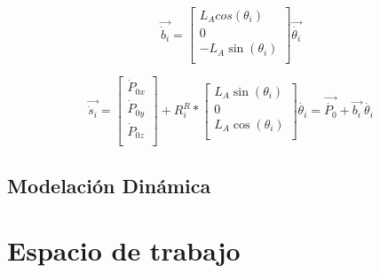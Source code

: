         \begin{equation}
                  \overrightarrow{\dot{b}_{i}}= \left[ \begin{matrix}
                L_{A} cos⁡ \left(  \theta _{i} \right) \\
                0\\
                - L_{A}\sin ⁡ \left(  \theta _{i} \right) \\
                \end{matrix}
                 \right] \overrightarrow{\dot{ \theta _{i}}}  
            \label{eq:cap4_MB_18}
        \end{equation} 
        
        \begin{equation}
                  \overrightarrow{\dot{s}_{i}}= \left[ \begin{matrix}
                \dot{P}_{0x}\\
                \dot{P}_{0y}\\
                \dot{P}_{0z}\\
                \end{matrix}
                 \right] +R_{i}^{R}\ast \left[ \begin{matrix}
                L_{A}\sin  \left(  \theta _{i} \right) \\
                0\\
                L_{A}\cos  \left(  \theta _{i} \right) \\
                \end{matrix}
                 \right] \dot{ \theta _{i}}=\overrightarrow{\dot{P_{0}}}+\overrightarrow{b_{i}}~\dot{ \theta _{i}} 
            \label{eq:cap4_MB_19}
        \end{equation} 

        


        








    \newpage

    \subsection{Modelación Dinámica}
    
    \newpage


\section{Espacio de trabajo}

